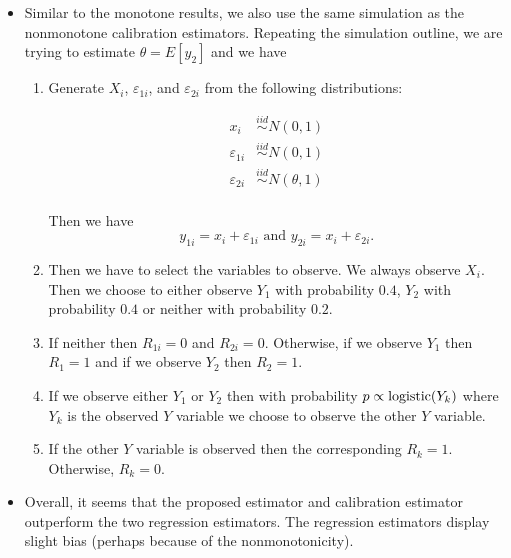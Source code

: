 \begin{itemize}
  \item Similar to the monotone results, we also use the same simulation as the
    nonmonotone calibration estimators. Repeating the simulation outline, we are
    trying to estimate $\theta = E[y_2]$ and we have

    \begin{enumerate}
      \item Generate $X_i$, $\varepsilon_{1i}$, and $\varepsilon_{2i}$ from the
        following distributions:

        \begin{align*}
          x_i &\stackrel{iid}{\sim} N(0, 1)\\
          \varepsilon_{1i} &\stackrel{iid}{\sim} N(0, 1)\\
          \varepsilon_{2i} &\stackrel{iid}{\sim} N(\theta, 1)\\
        \end{align*}

        Then we have
        \[y_{1i} = x_i + \varepsilon_{1i} \text{ and } y_{2i} = x_i +
        \varepsilon_{2i}.\]

      \item Then we have to select the variables to observe. We always observe
        $X_i$. Then we choose to either observe $Y_1$ with probability $0.4$,
        $Y_2$ with probability $0.4$ or neither with probability $0.2$.

      \item If neither then $R_{1i} = 0$ and $R_{2i} = 0$. Otherwise, if we 
        observe $Y_1$ then $R_1 = 1$ and if we observe $Y_2$ then $R_2 = 1$.

      \item If we observe either $Y_1$ or $Y_2$ then with probability $p \propto
        {\text{logistic}}(Y_k)$ where $Y_k$ is the observed $Y$ variable we choose to
        observe the other $Y$ variable.

      \item If the other $Y$ variable is observed then the corresponding $R_k =
        1$. Otherwise, $R_k = 0$.
    \end{enumerate}

    
    
    

  \item Overall, it seems that the proposed estimator and calibration estimator
    outperform the two regression estimators. The regression estimators display
    slight bias (perhaps because of the nonmonotonicity).

\end{itemize}

\newpage
